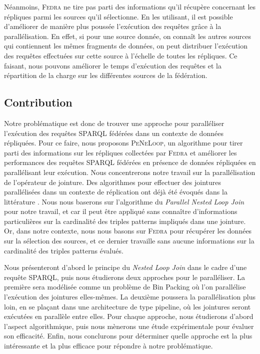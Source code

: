 \documentclass[a4paper]{article}
\def\fedra{\textsc{Fedra}\xspace}
\def\peneloop{\textsc{PeNeLoop}\xspace}
\begin{document}
Néanmoins, \fedra ne tire pas parti des informations qu'il récupère concernant les répliques parmi les sources qu'il sélectionne. En les utilisant, il est possible d'améliorer de manière plus poussée l'exécution des requêtes grâce à la parallélisation. En effet, si pour une source donnée, on connaît les autres sources qui contiennent les mêmes fragments de données, on peut distribuer l'exécution des requêtes effectuées sur cette source à l'échelle de toutes les répliques. Ce faisant, nous pouvons améliorer le temps d'exécution des requêtes et la répartition de la charge sur les différentes sources de la fédération.

\subsection{Contribution}

Notre problématique est donc de trouver une approche pour paralléliser l'exécution des requêtes SPARQL fédérées dans un contexte de données répliquées. Pour ce faire, nous proposons \peneloop, un algorithme pour tirer parti des informations sur les répliques collectées par \fedra et améliorer les performances des requêtes SPARQL fédérées en présence de données répliquées en parallélisant leur exécution. Nous concentrerons notre travail sur la parallélisation de l'opérateur de jointure. Des algorithmes pour effectuer des jointures parallélisées dans un contexte de réplication ont déjà été évoqués dans la littérature \cite{ozsu2011principles}. Nous nous baserons sur l'algorithme du \textit{Parallel Nested Loop Join} pour notre travail, et car il peut être appliqué sans connaître d'informations particulières sur la cardinalité des triples patterns impliqués dans une jointure. Or, dans notre contexte, nous nous basons sur \fedra pour récupérer les données sur la sélection des sources, et ce dernier travaille sans aucune informations sur la cardinalité des triples patterns évalués.

Nous présenteront d'abord le principe du \textit{Nested Loop Join} dans le cadre d'une requête SPARQL, puis nous étudierons deux approches pour le paralléliser. La première sera modélisée comme un problème de Bin Packing où l'on parallélise l'exécution des jointures elles-mêmes. La deuxième poussera la parallélisation plus loin, en se plaçant dans une architecture de type pipeline, où les jointures seront exécutées en parallèle entre elles. Pour chaque approche, nous étudierons d'abord l'aspect algorithmique, puis nous mènerons une étude expérimentale pour évaluer son efficacité. Enfin, nous conclurons pour déterminer quelle approche est la plus intéressante et la plus efficace pour répondre à notre problématique.
\end{document}
